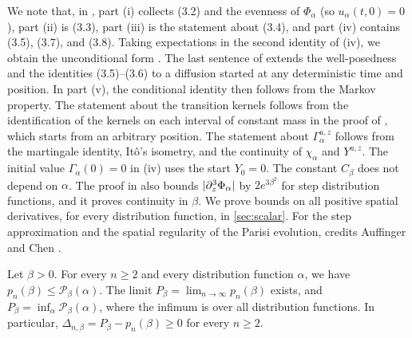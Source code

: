 We note that, in \cite{oai-barriers}, part (i) collects (3.2) and the evenness of
$\Phi_\alpha$ (so $u_\alpha(t,0)=0$), part (ii) is (3.3), part (iii) is the
statement about (3.4), and part (iv) contains (3.5), (3.7), and (3.8). Taking
expectations in the second identity of (iv), we obtain the unconditional form
\cite[(3.6)]{oai-barriers}. The last sentence of \cite[Lemma~3.1]{oai-barriers}
extends the well-posedness and the identities (3.5)--(3.6) to a diffusion started
at any deterministic time and position. In part (v), the conditional identity
then follows from the Markov property. The statement about the transition
kernels follows from the identification of the kernels on each interval of
constant mass in the proof of \cite[Lemma~3.1]{oai-barriers}, which starts from
an arbitrary position. The statement about $\Gamma^{a,z}_\alpha$ follows from the
martingale identity, It\^o's isometry, and the continuity of $\chi_\alpha$ and
$Y^{a,z}$. The initial value
$\Gamma_\alpha(0)=0$ in (iv) uses the start $Y_0=0$. The constant $C_\beta$
does not depend on $\alpha$.
The proof in \cite{oai-barriers} also bounds $\lvert \partial_z^3\Phi_\alpha\rvert$ by
$2e^{3\beta^2}$ for step distribution functions, and it proves continuity in
$\beta$. We prove bounds on all positive spatial derivatives, for every
distribution function, in \cref{sec:scalar}. For the step approximation and the
spatial regularity of the Parisi evolution, \cite{oai-barriers} credits
Auffinger and Chen \cite[Propositions~1--2]{auffinger-chen-2015}.

\begin{theorem}\label{inp:parisi}
Let $\beta>0$. For every $n\ge2$ and every distribution function $\alpha$, we
have $p_n(\beta)\le\mathcal P_\beta(\alpha)$. The limit
$P_\beta=\lim_{n\to\infty}p_n(\beta)$ exists, and
$P_\beta=\inf_\alpha\mathcal P_\beta(\alpha)$, where the infimum is over all
distribution functions. In particular, $\Delta_{n,\beta}=P_\beta-p_n(\beta)\ge0$
for every $n\ge2$.
\end{theorem}

